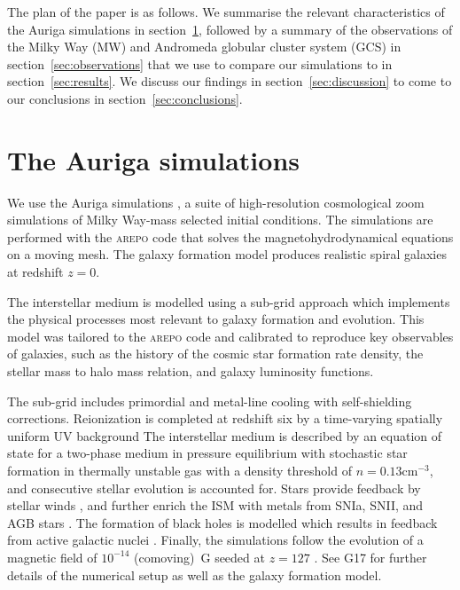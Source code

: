 \documentclass[a4paper,fleqn,usenatbib]{mnras}
\providecommand{\DIFaddend}{} %
\begin{document}
\DIFaddend The plan of the paper is as follows. We summarise the relevant characteristics 
of the Auriga simulations in section~\ref{sec:auriga}, followed by a summary of 
the observations of the Milky Way (MW) and Andromeda globular cluster system (GCS)
in section~\ref{sec:observations} that we use to compare our simulations to in
section~\ref{sec:results}. We discuss our findings in section~\ref{sec:discussion}
to come to our conclusions in section~\ref{sec:conclusions}.


\section{The Auriga simulations}
\label{sec:auriga}
We use the Auriga simulations \citep[][hereafter G17]{2017MNRAS.467..179G}, a
suite of high-resolution cosmological zoom simulations of Milky Way-mass
selected initial conditions. The simulations are performed with the \textsc{arepo} 
\citep{2010MNRAS.401..791S, 2016MNRAS.455.1134P} code that solves the 
magnetohydrodynamical equations on a moving mesh. The galaxy formation model 
produces realistic spiral galaxies at redshift $z=0$.

The interstellar medium is modelled using a sub-grid approach which implements
the physical processes most relevant to galaxy formation and evolution.
This model was tailored to the \textsc{arepo} code and calibrated to reproduce
key observables of galaxies, such as the history of the cosmic star formation rate
density, the stellar mass to halo mass relation, and galaxy luminosity functions.

The sub-grid includes primordial and metal-line cooling with self-shielding
corrections. Reionization is completed at redshift six by a time-varying
spatially uniform UV background \citep{2009ApJ...703.1416F, 2013MNRAS.436.3031V}
The interstellar medium is described by an equation of state for a two-phase medium
in pressure equilibrium \citep{2003MNRAS.339..289S} with stochastic star formation
in thermally unstable gas with a density threshold of $n = 0.13 \text{cm}^{-3}$,
and consecutive stellar evolution is accounted for. Stars provide feedback by
stellar winds \citep{2014MNRAS.437.1750M, 2017MNRAS.467..179G}, and further
enrich the ISM with metals from SNIa, SNII, and AGB stars \citep{2013MNRAS.436.3031V}.
The formation of black holes is modelled which results in feedback from active
galactic nuclei \citep{2005MNRAS.361..776S, 2014MNRAS.437.1750M, 2017MNRAS.467..179G}.
Finally, the simulations follow the evolution of a magnetic field of $10^{-14}$
(comoving)~G seeded at $z = 127$ \citep{2013MNRAS.432..176P, 2014ApJ...783L..20P}.
See G17 for further details of the numerical setup as well as the galaxy formation
model.
\end{document}
